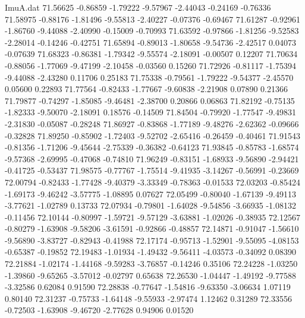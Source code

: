 \begin{filecontents}{ImuA.dat}
  71.56625   -0.86859   -1.79222   -9.57967   -2.44043   -0.24169   -0.76336
  71.58975   -0.88176   -1.81496   -9.55813   -2.40227   -0.07376   -0.69467
  71.61287   -0.92961   -1.86760   -9.44088   -2.40990   -0.15009   -0.70993
  71.63592   -0.97866   -1.81256   -9.52583   -2.28014   -0.14246   -0.42751
  71.65894   -0.89013   -1.80658   -9.54736   -2.42517    0.04073   -0.07639
  71.68323   -0.86381   -1.79342   -9.55574   -2.18091   -0.00507    0.12207
  71.70634   -0.88056   -1.77069   -9.47199   -2.10458   -0.03560    0.15260
  71.72926   -0.81117   -1.75394   -9.44088   -2.43280    0.11706    0.25183
  71.75338   -0.79561   -1.79222   -9.54377   -2.45570    0.05600    0.22893
  71.77564   -0.82433   -1.77667   -9.60838   -2.21908    0.07890    0.21366
  71.79877   -0.74297   -1.85085   -9.46481   -2.38700    0.20866    0.06863
  71.82192   -0.75135   -1.82333   -9.50070   -2.18091    0.18576   -0.14509
  71.84504   -0.79920   -1.77547   -9.49831   -2.31830   -0.05087   -0.28248
  71.86927   -0.83868   -1.77189   -9.48276   -2.62362   -0.09666   -0.32828
  71.89250   -0.85902   -1.72403   -9.52702   -2.65416   -0.26459   -0.40461
  71.91543   -0.81356   -1.71206   -9.45644   -2.75339   -0.36382   -0.64123
  71.93845   -0.85783   -1.68574   -9.57368   -2.69995   -0.47068   -0.74810
  71.96249   -0.83151   -1.68933   -9.56890   -2.94421   -0.41725   -0.53437
  71.98575   -0.77767   -1.75514   -9.41935   -3.14267   -0.56991   -0.23669
  72.00794   -0.82433   -1.77428   -9.40379   -3.33349   -0.78363   -0.01533
  72.03203   -0.85424   -1.69173   -9.46242   -3.57775   -1.08895    0.07627
  72.05499   -0.80040   -1.67139   -9.49113   -3.77621   -1.02789    0.13733
  72.07934   -0.79801   -1.64028   -9.54856   -3.66935   -1.08132   -0.11456
  72.10144   -0.80997   -1.59721   -9.57129   -3.63881   -1.02026   -0.38935
  72.12567   -0.80279   -1.63908   -9.58206   -3.61591   -0.92866   -0.48857
  72.14871   -0.91047   -1.56610   -9.56890   -3.83727   -0.82943   -0.41988
  72.17174   -0.95713   -1.52901   -9.55095   -4.08153   -0.65387   -0.19852
  72.19483   -1.01934   -1.49432   -9.56411   -4.03573   -0.34092    0.08390
  72.21884   -1.02174   -1.44168   -9.59283   -3.76857   -0.14246    0.35106
  72.24228   -1.03250   -1.39860   -9.65265   -3.57012   -0.02797    0.65638
  72.26530   -1.04447   -1.49192   -9.77588   -3.32586    0.62084    0.91590
  72.28838   -0.77647   -1.54816   -9.63350   -3.06634    1.07119    0.80140
  72.31237   -0.75733   -1.64148   -9.55933   -2.97474    1.12462    0.31289
  72.33556   -0.72503   -1.63908   -9.46720   -2.77628    0.94906    0.01520

\end{filecontents}
